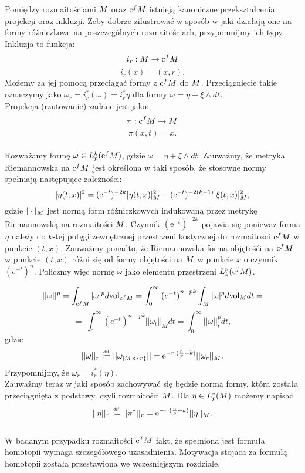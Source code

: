 \documentclass[licencjacka]{pracamgr}
\theoremstyle{definition}
\theoremstyle{definition}
\theoremstyle{plain}
\theoremstyle{plain}
\def\cfm{\ensuremath\mathrm{c}^fM}
\def\M{\ensuremath M}
\newcommand\deff{\mathrel{\overset{\makebox[0pt]{\mbox{\normalfont\tiny\sffamily def}}}{:=}}}
\begin{document}
Pomiędzy rozmaitościami $\M$ oraz $\cfm$ istnieją kanoniczne przekształcenia
projekcji oraz inkluzji. Żeby dobrze zilustrować w sposób w jaki działają one
na formy różniczkowe na poszczególnych rozmaitościach, przypomnijmy ich typy.
Inkluzja to funkcja:
\[
    i_r: \M \rightarrow \cfm \\
\]
\[
    i_r(x) = (x, r).
\]
Możemy za jej pomocą przeciągać formy z $\cfm$ do $\M$. Przeciągnięcie takie
oznaczymy jako $\omega_r = i_r^\ast(\omega) = i_r^\ast \eta $ dla formy $\omega
= \eta + \xi \wedge dt$. \\
Projekcja (rzutowanie) zadane jest jako:
\[
    \pi: \cfm \rightarrow \M
\]
\[
    \pi (x, t) = x.
\] \\


Rozważamy formę $\omega \in L^k_p (\cfm)$, gdzie
$\omega = \eta + \xi \wedge dt$.
Zauważmy, że metryka Riemannowska na $\cfm$ jest określona w taki sposób, że
stosowne normy spełniają następujące zależności:
$$
| \eta(t,x) |^2 = (\mathrm{e}^{-t})^{-2k} | \eta(t,x) |^2_{\M} +
(\mathrm{e}^{-t})^{-2(k-1)} | \xi(t,x) |^2_{\M},
$$
gdzie $|\cdot |_{\M} $ jest normą form różniczkowych indukowaną przez
metrykę Riemannowską na rozmaitości $\M$.  Czynnik $(\mathrm{e}^{-t})^{-2k}$
pojawia się ponieważ forma $\eta$ należy do $k$-tej potęgi zewnętrznej
przestrzeni kostycznej do rozmaitości $\cfm$ w punkcie $(t,x)$.  Zauważmy
ponadto, że Riemannowska forma objętośći na $\cfm$ w punkcie $(t,x)$ różni się
od formy objętości na $\M$ w punkcie $x$ o czynnik $(e^{-t})^n$.  Policzmy więc
normę $\omega$ jako elementu przestrzeni $L_k^p (\cfm)$.

\[
    ||\omega ||^p = \int_{\cfm} |\omega |^p d \mathrm{vol}_{\cfm} =
    \int_0^\infty \left( e^{-t} \right)^{n-pk} \int_M |\omega|^p d
    \mathrm{vol}_M dt = 
\]
\[
    = \
    \int_0^\infty \left( e^{-t} \right)^{n-pk} || \omega_t ||_{M} dt = 
    \int_0^\infty || \omega ||_t^p dt,
\] 
gdzie
\[
|| \omega ||_r \deff || \omega_{|M \times \{r\} } || =
\mathrm{e}^{-r \cdot (\frac{n}{p} - k) }  ||\omega_r ||_{\M}.
\]
Przypomnijmy, że $\omega_r = i_r^\ast (\eta)$. \\

Zauważmy teraz w jaki sposób zachowywać się będzie norma formy, która
została przeciągnięta z podstawy, czyli rozmaitości $\M$. Dla 
$\eta \in L_p^\ast (\M)$ możemy napisać
\[
    || \eta ||_r \deff || \pi^\ast ||_r = 
\mathrm{e}^{-r \cdot (\frac{n}{p} - k) }  ||\eta ||_{\M}.
\] \\

W badanym przypadku rozmaitości $\cfm$ fakt, że spełniona jest formuła homotopii
wymaga szczegółowego uzasadnienia. Motywacja stojaca za formułą homotopii
została przestawiona we wcześniejszym rozdziale.\\
\end{document}
